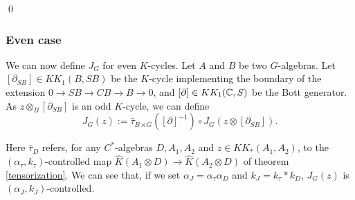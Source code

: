 \begin{dem}
\begin{enumerate}
\qed
\end{enumerate}
\end{dem}

\subsubsection{Even case}

We can now define $J_G$ for even $K$-cycles. Let $A$ and $B$ be two $G$-algebras. Let $[\partial_{SB}]\in KK_1(B,SB)$ be the $K$-cycle implementing the boundary of the extension $0\rightarrow SB\rightarrow CB\rightarrow B\rightarrow 0$, and $[\partial]\in KK_1(\mathbb C,S)$ be the Bott generator. As $z\otimes_B [\partial_{SB}]$ is an odd $K$-cycle, we can define
\[J_G(z):= \hat\tau_{B\rtimes G}([\partial]^{-1})\circ J_G(z\otimes[\partial_{SB}]).\] 

Here $\hat\tau_D$ refers, for any $C^*$-algebras $D,A_1,A_2$ and $z\in KK_*(A_1,A_2)$, to the $(\alpha_\tau,k_\tau)$-controlled map $\hat K (A_1\otimes D )\rightarrow \hat K(A_2\otimes D)$ of theorem \ref{tensorization}. We can see that, if we set $\alpha_J=\alpha_\tau \alpha_D$ and $k_J=k_\tau * k_D$, $J_G(z)$ is $(\alpha_J,k_J)$-controlled.\\

